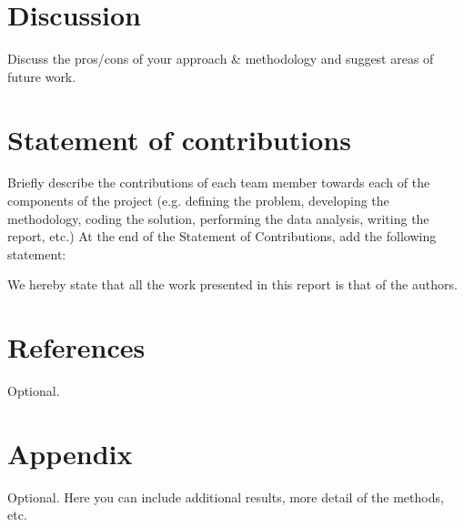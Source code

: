 \documentclass[conference]{IEEEtran}
\begin{document}

\section{Discussion}
Discuss the pros/cons of your approach \& methodology and suggest areas of future work.


\section*{Statement of contributions}

Briefly describe the contributions of each team member towards each of the components of the project (e.g. defining the problem, developing the methodology, coding the solution, performing the data analysis, writing the report, etc.) At the end of the Statement of Contributions, add the following statement: 

We hereby state that all the work presented in this report is that of the authors.


\section*{References}

Optional.



\section*{Appendix}

Optional. Here you can include additional results, more detail of the methods, etc.
\end{document}
